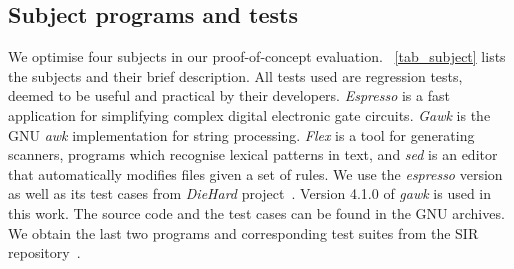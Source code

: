 \documentclass[oribibl]{llncs}
\begin{document}
%
%
%





\subsection{Subject programs and tests}
\label{sec_subject}

We optimise four subjects in our proof-of-concept evaluation. 
\tablename~\ref{tab_subject} lists the subjects and their brief description. All tests used are regression tests, deemed to be useful and practical by their developers.
\emph{Espresso} is a fast application for simplifying complex digital electronic gate circuits.
\emph{Gawk} is the GNU \emph{awk} implementation for string processing.
\emph{Flex} is a tool for generating scanners, programs which recognise lexical patterns in text, and \emph{sed} is an editor that automatically modifies files given a set of rules. 
We use the \emph{espresso} version as well as its test cases from \emph{DieHard} project~\cite{Berger:2006:DPM:1133981.1134000}.
Version 4.1.0 of \emph{gawk} is used in this work.
The source code and the test cases can be found in the GNU archives.
We obtain the last two programs and corresponding test suites from the SIR repository~\cite{SIR2005}. 
\end{document}
